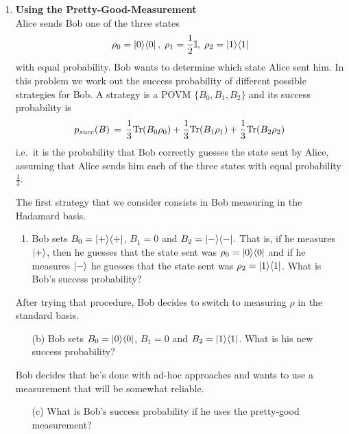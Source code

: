 \documentclass[12pt]{article}
\begin{document}
\begin{enumerate}
\item {\bf Using the Pretty-Good-Measurement}\\
Alice sends Bob one of the three states 
\[\rho_0 = \ket{0}\!\bra{0} ,\; \rho_1 = \frac12 \mathbb{I},\; \rho_2 = \ket{1}\!\bra{1}\]
 with equal probability. Bob wants to determine which state Alice sent him. In this problem we work out the success probability of different possible strategies for Bob. A strategy is a POVM $\{B_0,B_1,B_2\}$ and its success probability is 
\[ p_{succ}(B) \,=\, \frac{1}{3} \mathrm{Tr}(B_0\rho_0) + \frac{1}{3}\mathrm{Tr}(B_1\rho_1)+\frac{1}{3}\mathrm{Tr}(B_2\rho_2)\,\]
i.e.\ it is the probability that Bob correctly guesses the state sent by Alice, assuming that Alice sends him each of the three states with equal probability $\frac{1}{3}$. 

The first strategy that we consider consists in Bob measuring in the Hadamard basis. 
\begin{enumerate}
\item Bob sets $B_0 = \ket{+}\!\bra{+}$, $B_1=0$ and $B_2 = \ket{-}\!\bra{-}$. That is, if he measures $\ket +$, then he guesses that the state sent was $\rho_0 = \ket{0}\!\bra{0}$ and if he measures $\ket -$ he guesses that the state sent was $\rho_2 = \ket{1}\!\bra{1}$. What is Bob's success probability?
\end{enumerate}
After trying that procedure, Bob decides to switch to measuring $\rho$ in the standard basis.
\begin{enumerate}
\item[(b)] Bob sets $B_0=\ket{0}\!\bra{0}$, $B_1=0$ and $B_2 = \ket{1}\!\bra{1}$. What is his new success probability?
\end{enumerate}
Bob decides that he's done with ad-hoc approaches and wants to use a measurement that will be somewhat reliable.
\begin{enumerate}
\item[(c)] What is Bob's success probability if he uses the pretty-good measurement? 

\end{enumerate}
\end{enumerate}
\end{document}
